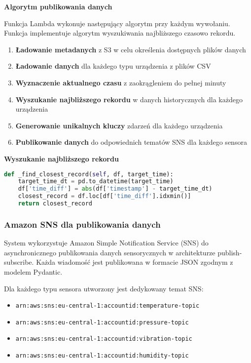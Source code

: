 \textbf{Algorytm publikowania danych}

Funkcja Lambda wykonuje następujący algorytm przy każdym wywołaniu. Funkcja implementuje algorytm wyszukiwania najbliższego czasowo rekordu.

\begin{enumerate}
    \item \textbf{Ładowanie metadanych} z S3 w celu określenia dostępnych plików danych
    \item \textbf{Ładowanie danych} dla każdego typu urządzenia z plików CSV
    \item \textbf{Wyznaczenie aktualnego czasu} z zaokrągleniem do pełnej minuty
    \item \textbf{Wyszukanie najbliższego rekordu} w danych historycznych dla każdego urządzenia
    \item \textbf{Generowanie unikalnych kluczy} zdarzeń dla każdego urządzenia
    \item \textbf{Publikowanie danych} do odpowiednich tematów SNS dla każdego sensora
\end{enumerate}

\textbf{Wyszukanie najbliższego rekordu}

\begin{lstlisting}[language=Python, caption=Algorytm wyszukiwania najbliższego rekordu]
def _find_closest_record(self, df, target_time):
    target_time_dt = pd.to_datetime(target_time)
    df['time_diff'] = abs(df['timestamp'] - target_time_dt)
    closest_record = df.loc[df['time_diff'].idxmin()]
    return closest_record
\end{lstlisting}

\subsubsection{Amazon SNS dla publikowania danych}
\label{subsec:amazon_sns}

System wykorzystuje Amazon Simple Notification Service (SNS) do asynchronicznego publikowania danych sensorycznych w architekturze publish-subscribe. Każda wiadomość jest publikowana w formacie JSON zgodnym z modelem Pydantic.

Dla każdego typu sensora utworzony jest dedykowany temat SNS:

\begin{itemize}
    \item \texttt{arn:aws:sns:eu-central-1:accountid:temperature-topic}
    \item \texttt{arn:aws:sns:eu-central-1:accountid:pressure-topic}
    \item \texttt{arn:aws:sns:eu-central-1:accountid:vibration-topic}
    \item \texttt{arn:aws:sns:eu-central-1:accountid:humidity-topic}
\end{itemize}

